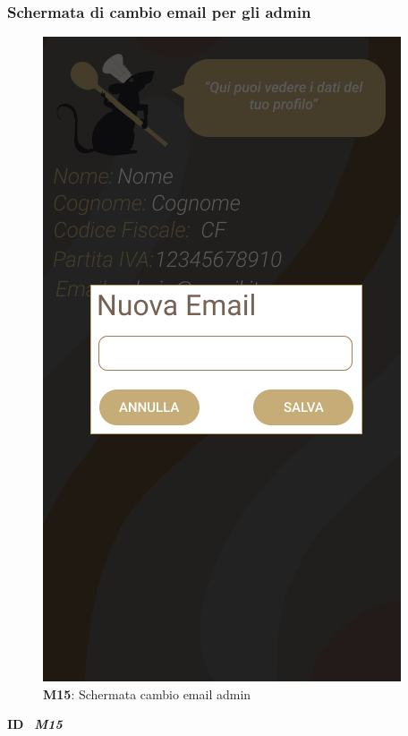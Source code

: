                 \subsubsection{Schermata di cambio email per gli admin}
                  \begin{figure}[H]
                    \centering
                    \includegraphics[scale=0.5]{assets/Mockup/Mockup_AdminChangeMail.png}
                    \caption*{\textbf{M15}: Schermata cambio email admin}\label{fig:Mockup_AdminChangeMail}
                  \end{figure}
        
                  \begin{flushleft}
                    \textbf{ID}   \ \Large{\textit{\textbf{M15}}}
                  \end{flushleft}
        
